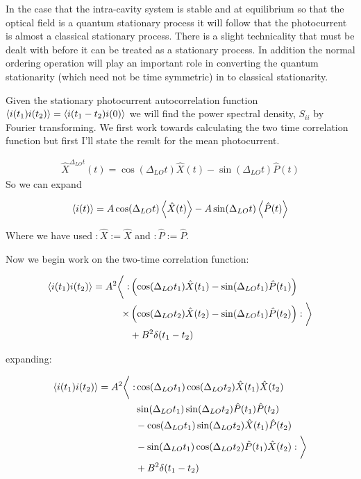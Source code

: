 \documentclass[12pt]{article}
\begin{document}
In the case that the intra-cavity system is stable and at equilibrium so that the optical field is a quantum stationary process it will follow that the photocurrent is almost a classical stationary process. There is a slight technicality that must be dealt with before it can be treated as a stationary process. In addition the normal ordering operation will play an important role in converting the quantum stationarity (which need not be time symmetric) in to classical stationarity.

Given the stationary photocurrent autocorrelation function $\Braket{i(t_1)i(t_2)} = \Braket{i(t_1-t_2)i(0)}$ we will find the power spectral density, $S_{ii}$ by Fourier transforming. We first work towards calculating the two time correlation function but first I'll state the result for the mean photocurrent.

\begin{align}
\hat{X}^{\Delta_{LO} t}(t) = \cos(\Delta_{LO}t) \hat{X}(t) - \sin(\Delta_{LO}t)\hat{P}(t)
\end{align}
So we can expand

\begin{align}
\Braket{i(t)} = A \cos(\Delta_{LO} t) \Braket{\hat{X}(t)} - A \sin(\Delta_{LO}t) \Braket{\hat{P}(t)}
\end{align}

Where we have used $:\hat{X}:=\hat{X}$ and $:\hat{P}:=\hat{P}$.

Now we begin work on the two-time correlation function:

\begin{align}
\Braket{i(t_1)i(t_2)} = A^2\bigg<: &\left(\cos(\Delta_{LO} t_1) \hat{X}(t_1) - \sin(\Delta_{LO}t_1) \hat{P}(t_1)\right) \\
\times &\left(\cos(\Delta_{LO} t_2) \hat{X}(t_2) - \sin(\Delta_{LO}t_1) \hat{P}(t_2)\right) :\bigg>\\
&+B^2 \delta(t_1-t_2)
\end{align}

expanding:

\begin{align}
\Braket{i(t_1)i(t_2)} = A^2\bigg<: &\cos(\Delta_{LO}t_1) \cos(\Delta_{LO}t_2) \hat{X}(t_1)\hat{X}(t_2)\\
&\sin(\Delta_{LO}t_1) \sin(\Delta_{LO}t_2) \hat{P}(t_1)\hat{P}(t_2)\\
&-\cos(\Delta_{LO}t_1) \sin(\Delta_{LO}t_2) \hat{X}(t_1)\hat{P}(t_2)\\
&-\sin(\Delta_{LO}t_1) \cos(\Delta_{LO}t_2) \hat{P}(t_1)\hat{X}(t_2):\bigg>\\
&+ B^2 \delta(t_1-t_2)
\end{align}
\end{document}
